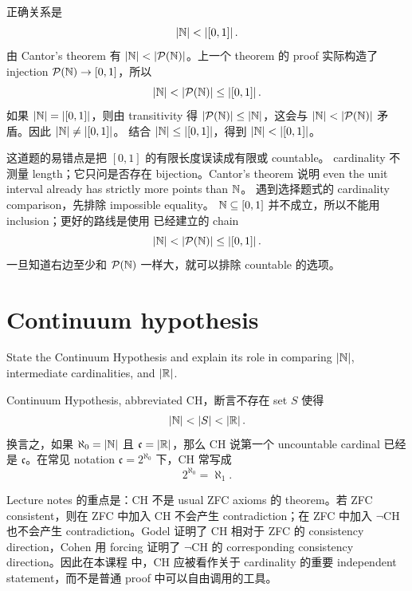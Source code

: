 \begin{solution}
正确关系是
\[
  \left|\mathbb{N}\right|<\left|[0,1]\right|.
\]
由 Cantor's theorem 有 \(\left|\mathbb{N}\right|<\left|\mathcal{P}(\mathbb{N})\right|\)。上一个 theorem 的
proof 实际构造了 injection \(\mathcal{P}(\mathbb{N})\to[0,1]\)，所以
\[
  \left|\mathbb{N}\right|<\left|\mathcal{P}(\mathbb{N})\right|\le\left|[0,1]\right|.
\]
如果 \(\left|\mathbb{N}\right|=\left|[0,1]\right|\)，则由 transitivity 得
\(\left|\mathcal{P}(\mathbb{N})\right|\le\left|\mathbb{N}\right|\)，这会与
\(\left|\mathbb{N}\right|<\left|\mathcal{P}(\mathbb{N})\right|\) 矛盾。因此 \(\left|\mathbb{N}\right|\ne\left|[0,1]\right|\)。
结合 \(\left|\mathbb{N}\right|\le\left|[0,1]\right|\)，得到
\(\left|\mathbb{N}\right|<\left|[0,1]\right|\)。
\end{solution}

\begin{explanation}
这道题的易错点是把 \([0,1]\) 的有限长度误读成有限或 countable。
cardinality 不测量 length；它只问是否存在 bijection。Cantor's theorem
说明 even the unit interval already has strictly more points than \(\mathbb{N}\)。
遇到选择题式的 cardinality comparison，先排除 impossible equality。
\(\mathbb{N}\subseteq[0,1]\) 并不成立，所以不能用 inclusion；更好的路线是使用
已经建立的 chain
\[
  \left|\mathbb{N}\right|<\left|\mathcal{P}(\mathbb{N})\right|\leq\left|[0,1]\right|.
\]
一旦知道右边至少和 \(\mathcal{P}(\mathbb{N})\) 一样大，就可以排除 countable 的选项。
\end{explanation}

\section{Continuum hypothesis \optional}

\begin{exerciseblock}
State the Continuum Hypothesis and explain its role in comparing
\(\left|\mathbb{N}\right|\), intermediate cardinalities, and \(\left|\mathbb{R}\right|\).
\end{exerciseblock}

\begin{solution}
Continuum Hypothesis, abbreviated CH，断言不存在 set \(S\) 使得
\[
  \left|\mathbb{N}\right|<\left|S\right|<\left|\mathbb{R}\right|.
\]
换言之，如果 \(\aleph_0=\left|\mathbb{N}\right|\) 且
\(\mathfrak c=\left|\mathbb{R}\right|\)，那么 CH 说第一个 uncountable cardinal 已经是
\(\mathfrak c\)。在常见 notation \(\mathfrak c=2^{\aleph_0}\) 下，CH 常写成
\[
  2^{\aleph_0}=\aleph_1.
\]

Lecture notes 的重点是：CH 不是 usual ZFC axioms 的 theorem。若 ZFC
consistent，则在 ZFC 中加入 CH 不会产生 contradiction；在 ZFC 中加入
\(\lnot\mathrm{CH}\) 也不会产生 contradiction。Godel 证明了 CH 相对于 ZFC
的 consistency direction，Cohen 用 forcing 证明了
\(\lnot\mathrm{CH}\) 的 corresponding consistency direction。因此在本课程
中，CH 应被看作关于 cardinality 的重要 independent statement，而不是普通
proof 中可以自由调用的工具。
\end{solution}

